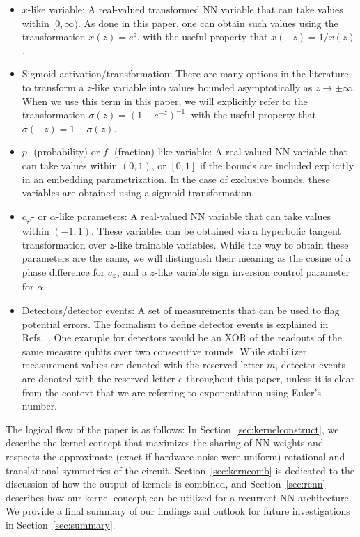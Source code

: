 \begin{itemize}
\item $x$-like variable: A real-valued transformed NN variable that can take values within $[0, \infty)$. As done in this paper, one can obtain such values using the transformation $x(z)=e^z$, with the useful property that $x(-z)=1/x(z)$.
\item Sigmoid activation/transformation: There are many options in the literature to transform a $z$-like variable into values bounded asymptotically as $z \to \pm \infty$. When we use this term in this paper, we will explicitly refer to the transformation $\sigma(z)=\left(1+e^{-z}\right)^{-1}$, with the useful property that $\sigma(-z)=1-\sigma(z)$.
\item $p$- (probability) or $f$- (fraction) like variable: A real-valued NN variable that can take values within $(0, 1)$, or $[0,1]$ if the bounds are included explicitly in an embedding parametrization. In the case of exclusive bounds, these variables are obtained using a sigmoid transformation.
\item $c_\varphi$- or $\alpha$-like parameters: A real-valued NN variable that can take values within $(-1, 1)$. These variables can be obtained via a hyperbolic tangent transformation over $z$-like trainable variables. While the way to obtain these parameters are the same, we will distinguish their meaning as the cosine of a phase difference for $c_\varphi$, and a $z$-like variable sign inversion control parameter for $\alpha$.
\item Detectors/detector events: A set of measurements that can be used to flag potential errors. The formalism to define detector events is explained in Refs.~\cite{Gidney:2021,Higgott:2023,Bausch:2023jgi}. One example for detectors would be an XOR of the readouts of the same measure qubits over two consecutive rounds. While stabilizer measurement values are denoted with the reserved letter $m$, detector events are denoted with the reserved letter $e$ throughout this paper, unless it is clear from the context that we are referring to exponentiation using Euler's number.
\end{itemize}

The logical flow of the paper is as follows: In Section~\ref{sec:kernelconstruct}, we describe the kernel concept that maximizes the sharing of NN weights and respects the approximate (exact if hardware noise were uniform) rotational and translational symmetries of the circuit. Section~\ref{sec:kerncomb} is dedicated to the discussion of how the output of kernels is combined, and Section~\ref{sec:rcnn} describes how our kernel concept can be utilized for a recurrent NN architecture. We provide a final summary of our findings and outlook for future investigations in Section~\ref{sec:summary}.
